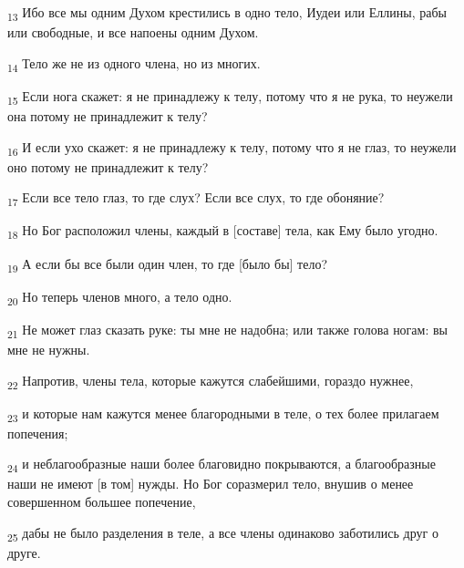\begin{tcolorbox}
\textsubscript{13} Ибо все мы одним Духом крестились в одно тело, Иудеи или Еллины, рабы или свободные, и все напоены одним Духом.
\end{tcolorbox}
\begin{tcolorbox}
\textsubscript{14} Тело же не из одного члена, но из многих.
\end{tcolorbox}
\begin{tcolorbox}
\textsubscript{15} Если нога скажет: я не принадлежу к телу, потому что я не рука, то неужели она потому не принадлежит к телу?
\end{tcolorbox}
\begin{tcolorbox}
\textsubscript{16} И если ухо скажет: я не принадлежу к телу, потому что я не глаз, то неужели оно потому не принадлежит к телу?
\end{tcolorbox}
\begin{tcolorbox}
\textsubscript{17} Если все тело глаз, то где слух? Если все слух, то где обоняние?
\end{tcolorbox}
\begin{tcolorbox}
\textsubscript{18} Но Бог расположил члены, каждый в [составе] тела, как Ему было угодно.
\end{tcolorbox}
\begin{tcolorbox}
\textsubscript{19} А если бы все были один член, то где [было бы] тело?
\end{tcolorbox}
\begin{tcolorbox}
\textsubscript{20} Но теперь членов много, а тело одно.
\end{tcolorbox}
\begin{tcolorbox}
\textsubscript{21} Не может глаз сказать руке: ты мне не надобна; или также голова ногам: вы мне не нужны.
\end{tcolorbox}
\begin{tcolorbox}
\textsubscript{22} Напротив, члены тела, которые кажутся слабейшими, гораздо нужнее,
\end{tcolorbox}
\begin{tcolorbox}
\textsubscript{23} и которые нам кажутся менее благородными в теле, о тех более прилагаем попечения;
\end{tcolorbox}
\begin{tcolorbox}
\textsubscript{24} и неблагообразные наши более благовидно покрываются, а благообразные наши не имеют [в том] нужды. Но Бог соразмерил тело, внушив о менее совершенном большее попечение,
\end{tcolorbox}
\begin{tcolorbox}
\textsubscript{25} дабы не было разделения в теле, а все члены одинаково заботились друг о друге.
\end{tcolorbox}
